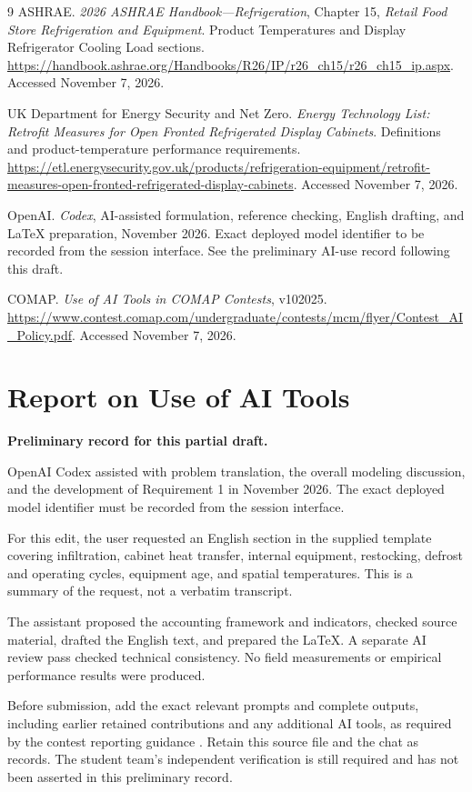 \documentclass[12pt]{article}
\begin{document}
\clearpage
{}
{}
\begin{thebibliography}{9}
ASHRAE. \emph{2026 ASHRAE Handbook---Refrigeration},
Chapter 15, \emph{Retail Food Store Refrigeration and Equipment}.
Product Temperatures and Display Refrigerator Cooling Load sections.
\url{https://handbook.ashrae.org/Handbooks/R26/IP/r26_ch15/r26_ch15_ip.aspx}.
Accessed November 7, 2026.

UK Department for Energy Security and Net Zero.
\emph{Energy Technology List: Retrofit Measures for Open Fronted Refrigerated Display Cabinets}.
Definitions and product-temperature performance requirements.
\url{https://etl.energysecurity.gov.uk/products/refrigeration-equipment/retrofit-measures-open-fronted-refrigerated-display-cabinets}.
Accessed November 7, 2026.

OpenAI. \emph{Codex}, AI-assisted formulation, reference checking,
English drafting, and LaTeX preparation, November 2026.
Exact deployed model identifier to be recorded from the session interface.
See the preliminary AI-use record following this draft.

COMAP. \emph{Use of AI Tools in COMAP Contests}, v102025.
\url{https://www.contest.comap.com/undergraduate/contests/mcm/flyer/Contest_AI_Policy.pdf}.
Accessed November 7, 2026.
\end{thebibliography}

\clearpage
{}
{}
\section*{Report on Use of AI Tools}
\noindent\textbf{Preliminary record for this partial draft.}

OpenAI Codex assisted with problem translation, the overall modeling discussion,
and the development of Requirement 1 in November 2026. The exact deployed model
identifier must be recorded from the session interface.

For this edit, the user requested an English section in the supplied template
covering infiltration, cabinet heat transfer, internal equipment, restocking,
defrost and operating cycles, equipment age, and spatial temperatures. This is
a summary of the request, not a verbatim transcript.

The assistant proposed the accounting framework and indicators, checked source
material, drafted the English text, and prepared the LaTeX. A separate AI review
pass checked technical consistency. No field measurements or empirical
performance results were produced.

Before submission, add the exact relevant prompts and complete outputs,
including earlier retained contributions and any additional AI tools, as
required by the contest reporting guidance \cite{aipolicy}. Retain this source
file and the chat as records. The student team's independent verification is
still required and has not been asserted in this preliminary record.
\end{document}
